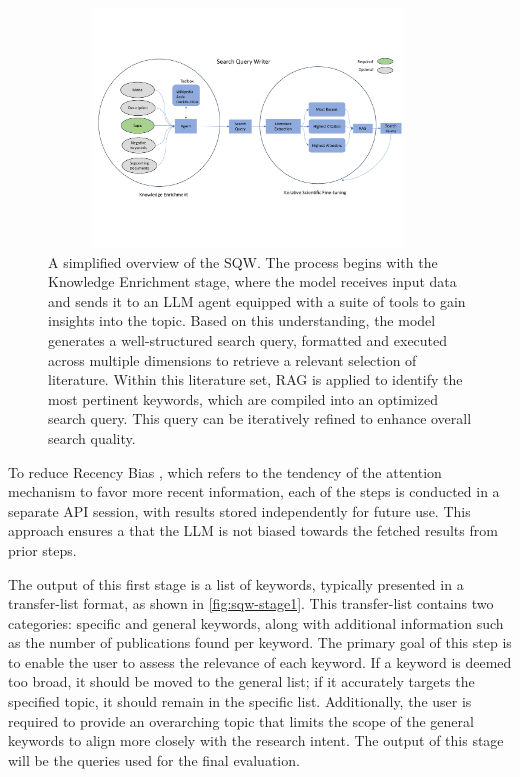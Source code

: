 \begin{figure}[!h]
	\centering
	\includegraphics[height=240px, width=400px]{pics/sqw-overview.pdf}
	\caption[Search Query Writer]{A simplified overview of the SQW. The process begins with the Knowledge Enrichment stage, where the model receives input data and sends it to an LLM agent equipped with a suite of tools to gain insights into the topic. Based on this understanding, the model generates a well-structured search query, formatted and executed across multiple dimensions to retrieve a relevant selection of literature. Within this literature set, RAG is applied to identify the most pertinent keywords, which are compiled into an optimized search query. This query can be iteratively refined to enhance overall search quality.}
	\label{fig:sqw-overview}
\end{figure}

To reduce Recency Bias \autocite{Deldjoo2024}, which refers to the tendency of the attention mechanism to favor more recent information, each of the steps is conducted in a separate API session, with results stored independently for future use. This approach ensures a that the LLM is not biased towards the fetched results from prior steps.

The output of this first stage is a list of keywords, typically presented in a transfer-list format, as shown in \autoref{fig:sqw-stage1}. This transfer-list contains two categories: specific and general keywords, along with additional information such as the number of publications found per keyword. The primary goal of this step is to enable the user to assess the relevance of each keyword. If a keyword is deemed too broad, it should be moved to the general list; if it accurately targets the specified topic, it should remain in the specific list. Additionally, the user is required to provide an overarching topic that limits the scope of the general keywords to align more closely with the research intent. The output of this stage will be the queries used for the final evaluation.

